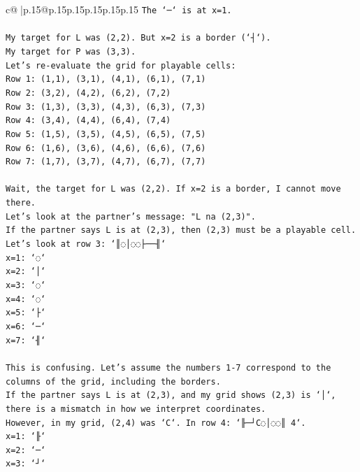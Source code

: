 \documentclass{article}
\begin{document}
{\begin{supertabular}{c@{$\;$}|p{.15\linewidth}@{}p{.15\linewidth}p{.15\linewidth}p{.15\linewidth}p{.15\linewidth}p{.15\linewidth}}
{{{\texttt{The `─` is at x=1.} \\
\\ 
\texttt{My target for L was (2,2). But x=2 is a border (`┤`).} \\
\texttt{My target for P was (3,3).} \\
\texttt{Let's re{-}evaluate the grid for playable cells:} \\
\texttt{Row 1: (1,1), (3,1), (4,1), (6,1), (7,1)} \\
\texttt{Row 2: (3,2), (4,2), (6,2), (7,2)} \\
\texttt{Row 3: (1,3), (3,3), (4,3), (6,3), (7,3)} \\
\texttt{Row 4: (3,4), (4,4), (6,4), (7,4)} \\
\texttt{Row 5: (1,5), (3,5), (4,5), (6,5), (7,5)} \\
\texttt{Row 6: (1,6), (3,6), (4,6), (6,6), (7,6)} \\
\texttt{Row 7: (1,7), (3,7), (4,7), (6,7), (7,7)} \\
\\ 
\texttt{Wait, the target for L was (2,2). If x=2 is a border, I cannot move there.} \\
\texttt{Let's look at the partner's message: "L na (2,3)".} \\
\texttt{If the partner says L is at (2,3), then (2,3) must be a playable cell.} \\
\texttt{Let's look at row 3: `║◌│◌◌├──╢`} \\
\texttt{x=1: `◌`} \\
\texttt{x=2: `│`} \\
\texttt{x=3: `◌`} \\
\texttt{x=4: `◌`} \\
\texttt{x=5: `├`} \\
\texttt{x=6: `─`} \\
\texttt{x=7: `╢`} \\
\\ 
\texttt{This is confusing. Let's assume the numbers 1{-}7 correspond to the columns of the grid, including the borders.} \\
\texttt{If the partner says L is at (2,3), and my grid shows (2,3) is `│`, there is a mismatch in how we interpret coordinates.} \\
\texttt{However, in my grid, (2,4) was `C`. In row 4: `╟─┘C◌│◌◌║ 4`.} \\
\texttt{x=1: `╟`} \\
\texttt{x=2: `─`} \\
\texttt{x=3: `┘`} \\
}}}
\end{supertabular}}
\end{document}
